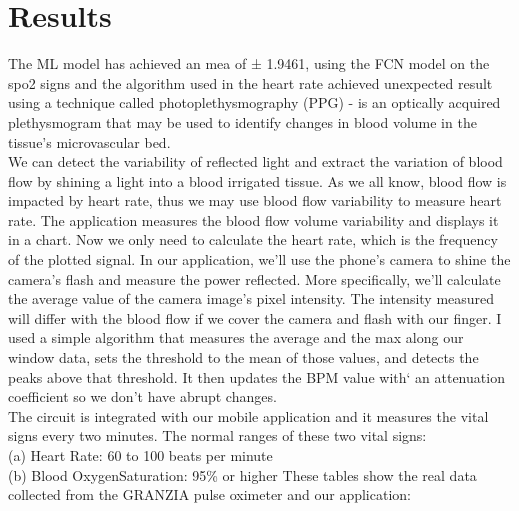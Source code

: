 \documentclass{bmcart}
\begin{document}
\section*{Results}
The ML model has achieved an mea of ± 1.9461, using the FCN model on the spo2
signs and the algorithm used in the heart rate achieved unexpected result using
a technique called photoplethysmography (PPG) - is an optically acquired
plethysmogram that may be used to identify changes in blood volume in the
tissue's microvascular bed.\\
We can detect the variability of reflected light and extract the variation of
blood flow by shining a light into a blood irrigated tissue. As we all know,
blood flow is impacted by heart rate, thus we may use blood flow variability to
measure heart rate. The application measures the blood flow volume variability
and displays it in a chart. Now we only need to calculate the heart rate, which
is the frequency of the plotted signal. In our application, we'll use the
phone's camera to shine the camera's flash and measure the power reflected. More
specifically, we'll calculate the average value of the camera image's pixel
intensity. The intensity measured will differ with the blood flow if we cover
the camera and flash with our finger. I used a simple algorithm that measures
the average and the max along our window data, sets the threshold to the mean of
those values, and detects the peaks above that threshold. It then updates the
BPM value with` an attenuation coefficient so we don't have abrupt changes.\\
The circuit is integrated with our mobile application and it measures the vital
signs every two minutes. The normal ranges of these two vital signs: \\(a) Heart
Rate: 60 to 100 beats per minute \cite{signs} \\(b) Blood OxygenSaturation: 95\%
or higher \cite{olvl} These tables show the real data collected from the GRANZIA
pulse oximeter and our application:
\end{document}
